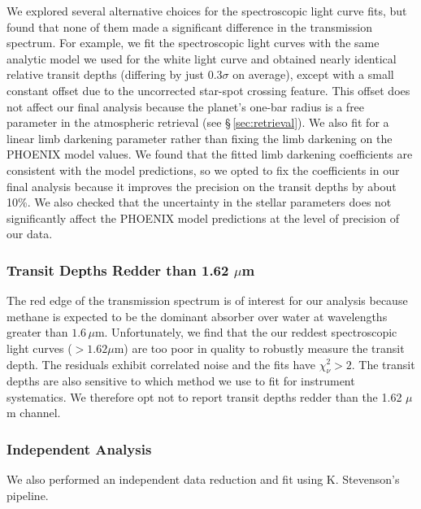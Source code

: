 \documentclass[twocolumn]{aastex61}
\begin{document}
We explored several alternative choices for the spectroscopic light curve fits, but found that none of them made a significant difference in the transmission spectrum. For example, we fit the spectroscopic light curves with the same analytic model we used for the white light curve and obtained nearly identical relative transit depths (differing by just $0.3\sigma$ on average), except with a small constant offset due to the uncorrected star-spot crossing feature. This offset does not affect our final analysis because the planet's one-bar radius is a free parameter in the atmospheric retrieval (see \S\,\ref{sec:retrieval}). We also fit for a linear limb darkening parameter rather than fixing the limb darkening on the PHOENIX model values. We found that the fitted limb darkening coefficients are consistent with the model predictions, so we opted to fix the coefficients in our final analysis because it improves the precision on the transit depths by about 10\%. We also checked that the uncertainty in the stellar parameters does not significantly affect the PHOENIX model predictions at the level of precision of our data. 

\subsubsection{Transit Depths Redder than 1.62 $\mu$m}
The red edge of the transmission spectrum is of interest for our analysis because methane is expected to be the dominant absorber over water at wavelengths greater than $1.6\,\mu$m. Unfortunately, we find that the our reddest spectroscopic light curves ($>1.62\mu$m) are too poor in quality to robustly measure the transit depth. The residuals exhibit correlated noise and the fits have $\chi^2_\nu>2$. The transit depths are also sensitive to which method we use to fit for instrument systematics.  We therefore opt not to report transit depths redder than the 1.62 $\mu$m channel.

\subsubsection{Independent Analysis}
We also performed an independent data reduction and fit using K. Stevenson's pipeline.
\end{document}
